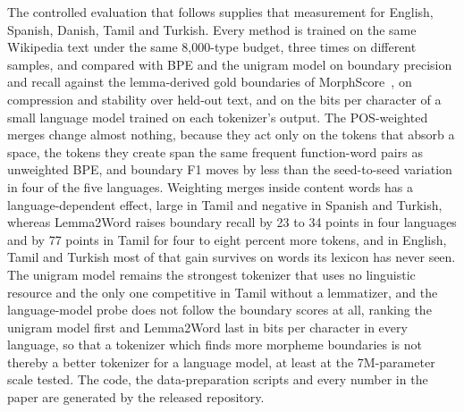 The controlled evaluation that follows supplies that measurement for English, Spanish, Danish, Tamil and Turkish.
Every method is trained on the same Wikipedia text under the same 8,000-type budget, three times on different samples, and compared with BPE and the unigram model on boundary precision and recall against the lemma-derived gold boundaries of MorphScore~\cite{arnett2025morphscore}, on compression and stability over held-out text, and on the bits per character of a small language model trained on each tokenizer's output.
The POS-weighted merges change almost nothing, because they act only on the tokens that absorb a space, the tokens they create span the same frequent function-word pairs as unweighted BPE, and boundary F1 moves by less than the seed-to-seed variation in four of the five languages.
Weighting merges inside content words has a language-dependent effect, large in Tamil and negative in Spanish and Turkish, whereas Lemma2Word raises boundary recall by 23 to 34 points in four languages and by 77 points in Tamil for four to eight percent more tokens, and in English, Tamil and Turkish most of that gain survives on words its lexicon has never seen.
The unigram model remains the strongest tokenizer that uses no linguistic resource and the only one competitive in Tamil without a lemmatizer, and the language-model probe does not follow the boundary scores at all, ranking the unigram model first and Lemma2Word last in bits per character in every language, so that a tokenizer which finds more morpheme boundaries is not thereby a better tokenizer for a language model, at least at the 7M-parameter scale tested.
The code, the data-preparation scripts and every number in the paper are generated by the released repository.
